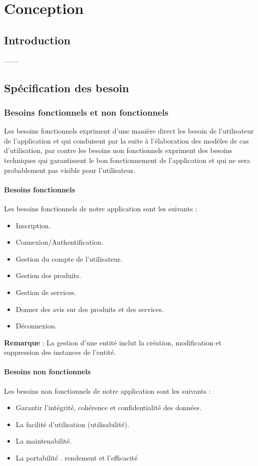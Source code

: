 \chapter{Conception}
\section{Introduction}
------\newline

\section{Spécification des besoin }
\subsection{Besoins fonctionnels et non fonctionnels }
\par Les besoins fonctionnels expriment d’une manière direct les besoin de
l’utilisateur de l’application et qui conduisent par la suite à l'élaboration
des modèles de cas d'utilisation, par contre les besoins non fonctionnels
expriment des besoins techniques qui garantissent le bon fonctionnement de
l'application et qui ne sera probablement pas visible pour l’utilisateur.
\subsubsection{Besoins fonctionnels }
\par Les besoins fonctionnels de notre application sont les suivants :
\begin{itemize}[label=\textbullet] 
\item Inscription.
\item Connexion/Authentification.
\item Gestion du compte de l’utilisateur.
\item Gestion des produits.
\item Gestion de services.
\item Donner des avis sur des produits et des services.
\item Déconnexion.
\end{itemize}
\textbf{Remarque} : La gestion d’une entité inclut la création, modification et
suppression des instances de l'entité.
\subsubsection{Besoins non fonctionnels }
\par Les besoins non fonctionnels de notre application sont les suivants :
\begin{itemize}[label=\textbullet] 
\item Garantir l'intégrité, cohérence et confidentialité des données.
\item La facilité d'utilisation (utilisabilité).
\item La maintenabilité.
\item La portabilité .
\itemLe rendement et l’efficacité 
\end{itemize}
